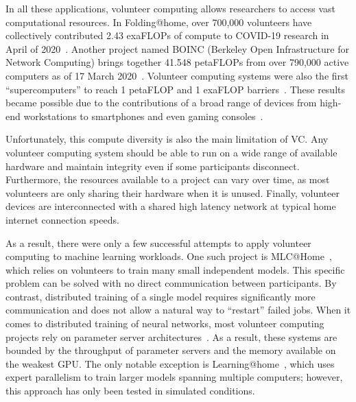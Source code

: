 In all these applications, volunteer computing allows researchers to access vast computational resources. In Folding@home, over 700,000 volunteers have collectively contributed 2.43 exaFLOPs of compute to COVID-19 research in April of 2020~\cite{folding_exaflop_2}. Another project named BOINC (Berkeley Open Infrastructure for Network Computing) brings together 41.548 petaFLOPs from over 790,000 active computers as of 17 March 2020~\cite{anderson2004boinc}. Volunteer computing systems were also the first ``supercomputers'' to reach 1 petaFLOP and 1 exaFLOP barriers~\cite{folding_exaflop_2, folding_petaflop}. These results became possible due to the contributions of a broad range of devices from high-end workstations to smartphones and even gaming consoles~\cite{folding_ps3}.

Unfortunately, this compute diversity is also the main limitation of VC. Any volunteer computing system should be able to run on a wide range of available hardware and maintain integrity even if some participants disconnect. Furthermore, the resources available to a project can vary over time, as most volunteers are only sharing their hardware when it is unused. Finally, volunteer devices are interconnected with a shared high latency network at typical home internet connection speeds.

As a result, there were only a few successful attempts to apply volunteer computing to machine learning workloads. One such project is MLC@Home~\cite{clemens2021mlds}, which relies on volunteers to train many small independent models. 
This specific problem can be solved with no direct communication between participants. By contrast, distributed training of a single model requires significantly more communication and does not allow a natural way to ``restart'' failed jobs. When it comes to distributed training of neural networks, most volunteer computing projects rely on parameter server architectures~\cite{lc0,volunteer_dl_async,atre2021distributed}. As a result, these systems are bounded by the throughput of parameter servers and the memory available on the weakest GPU. The only notable exception is Learning@home~\cite{hivemind_dmoe}, which uses expert parallelism to train larger models spanning multiple computers; however, this approach has only been tested in simulated conditions.

